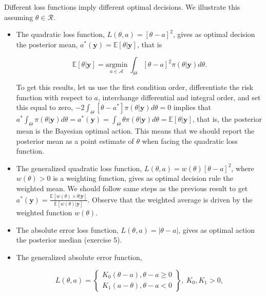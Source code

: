 Different loss functions imply different optimal decisions. We illustrate this assuming $\theta \in \mathcal{R}$.

\begin{itemize}
	\item The quadratic loss function, $L({\theta},a)=[{\theta}-a]^2$, gives as optimal decision the posterior mean, $a^*(\mathbf{y})=\mathbb{E}[{\theta}|\mathbf{y}]$, that is 
		
	\begin{equation*}
		\mathbb{E}[{\theta}|\mathbf{y}] = \underset{a \in \mathcal{A}}{\mathrm{argmin}} \  \int_{{\Theta}} [{\theta}-a]^2\pi({\theta}|\mathbf{y})d{\theta}.
	\end{equation*}
	
	To get this results, let us use the first condition order, differentiate the risk function with respect to $a$, interchange differential and integral order, and set this equal to zero, $-2\int_{{\Theta}} [{\theta}-a^*]\pi({\theta}|\mathbf{y})d{\theta}=0$ implies that $a^*\int_{{\Theta}} \pi({\theta}|\mathbf{y})d{\theta}=a^*(\mathbf{y})=\int_{{\Theta}} {\theta}\pi({\theta}|\mathbf{y})d{\theta}=\mathbb{E}[{\theta}|\mathbf{y}]$, that is, the posterior mean is the Bayesian optimal action. This means that we should report the posterior mean as a point estimate of $\theta$ when facing the quadratic loss function.
	
	\item The generalized quadratic loss function,  $L({\theta},a)=w({\theta})[{\theta}-a]^2$, where $w({\theta})>0$ is a weighting function, gives as optimal decision rule the weighted mean. We should follow same steps as the previous result to get   $a^*(\mathbf{y})=\frac{\mathbb{E}[w({\theta})\times{\theta}|\mathbf{y}]}{\mathbb{E}[w({\theta})|\mathbf{y}]}$. Observe that the weighted average is driven by the weighted function $w({\theta})$.
	
	\item The absolute error loss function, $L({\theta},a)=|{\theta}-a|$, gives as optimal action the posterior median (exercise 5).
	
	\item The generalized absolute error function,
	
	\begin{equation*}
		L(\theta,a)=\begin{Bmatrix} K_0(\theta-a), \theta-a\geq 0\\
			K_1(a-\theta), \theta-a < 0 \end{Bmatrix}, \ K_0,K_1>0,
	\end{equation*}
	

\end{itemize}
